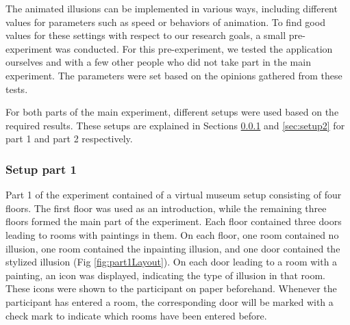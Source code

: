 \documentclass[a4paper]{article}
\begin{document}

The animated illusions can be implemented in various ways, including different values for parameters such as speed or behaviors of animation. To find good values for these settings with respect to our research goals, a small pre-experiment was conducted. For this pre-experiment, we tested the application ourselves and with a few other people who did not take part in the main experiment. The parameters were set based on the opinions gathered from these tests.



For both parts of the main experiment, different setups were used based on the required results. These setups are explained in Sections \ref{sec:setup1} and \ref{sec:setup2} for part 1 and part 2 respectively.

\subsubsection{Setup part 1}\label{sec:setup1}

Part 1 of the experiment contained of a virtual museum setup consisting of four floors. The first floor was used as an introduction, while the remaining three floors formed the main part of the experiment. Each floor contained three doors leading to rooms with paintings in them. On each floor, one room contained no illusion, one room contained the inpainting illusion, and one door contained the stylized illusion (Fig \ref{fig:part1Layout}). On each door leading to a room with a painting, an icon was displayed, indicating the type of illusion in that room. These icons were shown to the participant on paper beforehand. Whenever the participant has entered a room, the corresponding door will be marked with a check mark to indicate which rooms have been entered before. 
\end{document}
